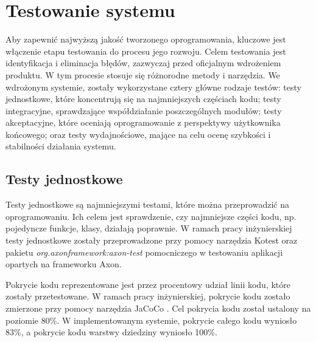 \clearpage %

\section{Testowanie systemu}

Aby zapewnić najwyższą jakość tworzonego oprogramowania, kluczowe jest włączenie etapu testowania do procesu jego rozwoju. Celem testowania jest identyfikacja i eliminacja błędów, zazwyczaj przed oficjalnym wdrożeniem produktu. W tym procesie stosuje się różnorodne metody i narzędzia. We wdrożonym systemie, zostały wykorzystane cztery główne rodzaje testów: testy jednostkowe, które koncentrują się na najmniejszych częściach kodu; testy integracyjne, sprawdzające współdziałanie poszczególnych modułów; testy akceptacyjne, które oceniają oprogramowanie z perspektywy użytkownika końcowego; oraz testy wydajnościowe, mające na celu ocenę szybkości i stabilności działania systemu.

\subsection{Testy jednostkowe}

Testy jednostkowe są najmniejszymi testami, które można przeprowadzić na oprogramowaniu. Ich celem jest sprawdzenie, czy najmniejsze części kodu, np. pojedyncze funkcje, klasy, działają poprawnie. W ramach pracy inżynierskiej testy jednostkowe zostały przeprowadzone przy pomocy narzędzia Kotest \cite{kotest} oraz pakietu \textit{org.axonframework:axon-test} pomocniczego w testowaniu aplikacji opartych na frameworku Axon.

Pokrycie kodu reprezentowane jest przez procentowy udział linii kodu, które zostały przetestowane. W ramach pracy inżynierskiej, pokrycie kodu zostało zmierzone przy pomocy narzędzia JaCoCo \cite{jacoco}. Cel pokrycia kodu został ustalony na poziomie 80\%. W implementowanym systemie, pokrycie całego kodu wyniosło 83\%, a pokrycie kodu warstwy dziedziny wyniosło 100\%.

